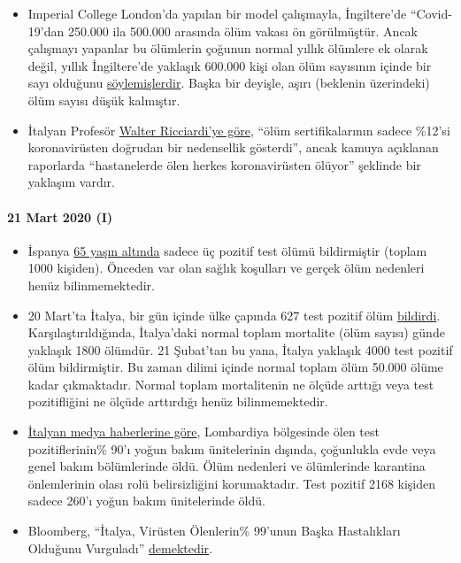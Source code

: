 \begin{itemize}
\tightlist
\item
  Imperial College London'da yapılan bir model çalışmayla, İngiltere'de
  ``Covid-19'dan 250.000 ila 500.000 arasında ölüm vakası ön
  görülmüştür. Ancak çalışmayı yapanlar bu ölümlerin çoğunun normal
  yıllık ölümlere ek olarak değil, yıllık İngiltere'de yaklaşık 600.000
  kişi olan ölüm sayısının içinde bir sayı olduğunu
  \href{https://www.bbc.com/news/health-51979654}{söylemişlerdir}. Başka
  bir deyişle, aşırı (beklenin üzerindeki) ölüm sayısı düşük kalmıştır.
\item
  İtalyan Profesör
  \href{https://www.nytimes.com/2020/03/20/opinion/coronavirus-pandemic-social-distancing.html}{Walter
  Ricciardi'ye göre}, ``ölüm sertifikalarının sadece \%12'si
  koronavirüsten doğrudan bir nedensellik gösterdi'', ancak kamuya
  açıklanan raporlarda ``hastanelerde ölen herkes koronavirüsten
  ölüyor'' şeklinde bir yaklaşım vardır.
\end{itemize}

\hypertarget{21-mart-2020-i}{%
\paragraph{21 Mart 2020 (I)}\label{21-mart-2020-i}}

\begin{itemize}
\tightlist
\item
  İspanya
  \href{https://www.20minutos.es/noticia/4193883/0/media-edad-coronavirus-espana/}{65
  yaşın altında} sadece üç pozitif test ölümü bildirmiştir (toplam 1000
  kişiden). Önceden var olan sağlık koşulları ve gerçek ölüm nedenleri
  henüz bilinmemektedir.
\item
  20 Mart'ta İtalya, bir gün içinde ülke çapında 627 test pozitif ölüm
  \href{https://www.msn.com/en-au/news/coronavirus/italy-coronavirus-deaths-surge-by-627-in-a-day-lifting-total-death-toll-to-4032/ar-BB11tDnS}{bildirdi}.
  Karşılaştırıldığında, İtalya'daki normal toplam mortalite (ölüm
  sayısı) günde yaklaşık 1800 ölümdür. 21 Şubat'tan bu yana, İtalya
  yaklaşık 4000 test pozitif ölüm bildirmiştir. Bu zaman dilimi içinde
  normal toplam ölüm 50.000 ölüme kadar çıkmaktadır. Normal toplam
  mortalitenin ne ölçüde arttığı veya test pozitifliğini ne ölçüde
  arttırdığı henüz bilinmemektedir.
\item
  \href{https://www.tgcom24.mediaset.it/cronaca/coronavirus-in-lombardia-9-morti-su-10-mai-giunti-in-terapia-intensiva_16362350-202002a.shtml}{İtalyan
  medya haberlerine göre}, Lombardiya bölgesinde ölen test
  pozitiflerinin\% 90'ı yoğun bakım ünitelerinin dışında, çoğunlukla
  evde veya genel bakım bölümlerinde öldü. Ölüm nedenleri ve ölümlerinde
  karantina önlemlerinin olası rolü belirsizliğini korumaktadır. Test
  pozitif 2168 kişiden sadece 260'ı yoğun bakım ünitelerinde öldü.
\item
  Bloomberg, ``İtalya, Virüsten Ölenlerin\% 99'unun Başka Hastalıkları
  Olduğunu Vurguladı''
  \href{https://www.bloomberg.com/news/articles/2020-03-18/99-of-those-who-died-from-virus-had-other-illness-italy-says}{demektedir}.
\end{itemize}

